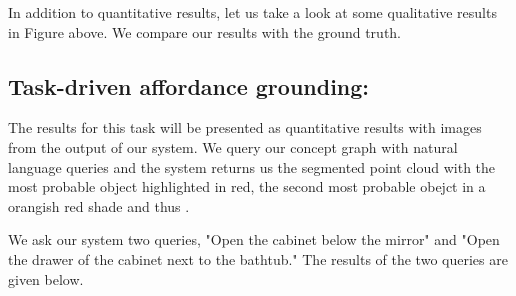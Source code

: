In addition to quantitative results, let us take a look at some qualitative results in Figure above. We compare our results with the ground truth.

\subsection{Task-driven affordance grounding:}
The results for this task will be presented as quantitative results with images from the output of our system. We query our concept graph with natural language
queries and the system returns us the segmented point cloud with the most probable object highlighted in red, the second most probable obejct in a orangish red shade and 
thus .

We ask our system two queries, "Open the cabinet below the mirror" and "Open the drawer of the cabinet next to the bathtub." 
The results of the two queries are given below.



